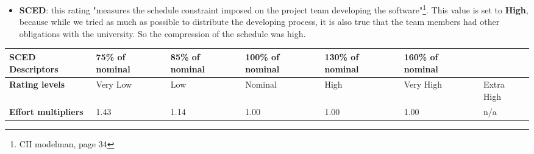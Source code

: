 		

		
		\begin{itemize}
			\item \textbf{SCED}: this rating "measures the schedule constraint imposed on the project team developing the
software"\footnote{CII modelman, page 34}. This value is set to \textbf{High}, because while we tried as much as possible to distribute the developing process, it is also true that the team members had other obligations with the university. So the compression of the schedule was high.
		\end{itemize}
		
		\begin{center}
			\begin{tabular}{ | C{2cm} | C{2cm} | C{2cm} | C{2cm} | C{2cm} | C{2cm} | C{2cm} | }
				\hline
				\textbf{SCED Descriptors} & 75\% of nominal & 85\% of nominal & 100\% of nominal & 130\% of nominal & 160\% of nominal & \\ \hline
				
				\textbf{Rating levels} & Very Low & Low & Nominal & High & Very High & Extra High\\ \hline
			
				\textbf{Effort multipliers} & 1.43 & 1.14 & 1.00 & 1.00 & 1.00 & n/a\\ \hline
			\end{tabular}
		\end{center}